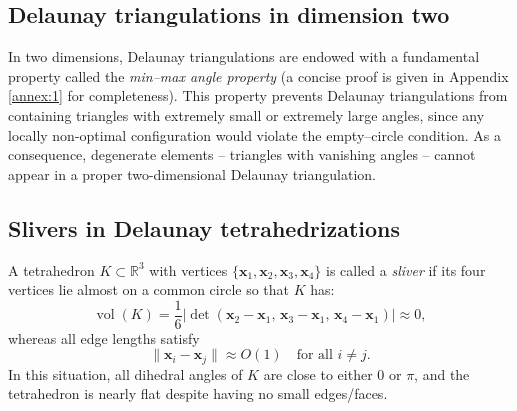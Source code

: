 \documentclass{article}
\begin{document}
\subsection{Delaunay triangulations in dimension two}

In two dimensions, Delaunay triangulations are endowed with a 
fundamental property called the \emph{min--max angle property} 
(a concise proof is given in Appendix \ref{annex:1} for completeness). 
This property prevents Delaunay triangulations from containing triangles with extremely small or extremely
large angles, since any locally non-optimal configuration would violate the 
empty--circle condition. As a consequence, degenerate elements -- 
triangles with vanishing angles -- cannot appear in a proper two-dimensional 
Delaunay triangulation.

\subsection{Slivers in Delaunay tetrahedrizations}

A tetrahedron $K \subset \mathbb{R}^3$ with vertices 
$\{\bm{x}_1,\bm{x}_2,\bm{x}_3,\bm{x}_4\}$ is called a \emph{sliver} if its four vertices lie almost on a
common circle so that $K$ has:
\[
\operatorname{vol}(K) = \frac{1}{6} |\det(\bm{x}_2-\bm{x}_1,\, \bm{x}_3-\bm{x}_1,\, \bm{x}_4-\bm{x}_1)| 
\approx 0,
\]
whereas all edge lengths satisfy
\[
\|\bm{x}_i - \bm{x}_j\| \approx O(1) \quad \text{for all } i \neq j.
\]
In this situation, all dihedral angles of $K$ are close to either
$0$ or $\pi$, and the tetrahedron is nearly flat despite having no small edges/faces.
\end{document}
